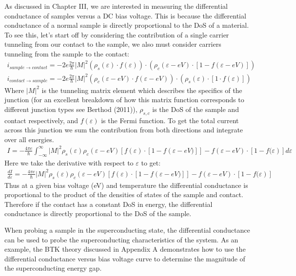 As discussed in Chapter III, we are interested in measuring the differential conductance of samples versus a DC bias voltage. This is because the differential conductance of a normal sample is directly proportional to the \ac{DoS} of a material. To see this, let's start off by considering the contribution of a single carrier tunneling from our contact to the sample, we also must consider carriers tunneling from the sample to the contact:
\begin{align}
    i_{sample \rightarrow contact} = -2e\frac{2\pi}{\hbar}|M|^{2}\left(\rho_{s}\left(\varepsilon\right)\cdot f\left(\varepsilon\right)\right)\cdot\left(\rho_{c}\left(\varepsilon-eV\right)\cdot\left[1-f\left(\varepsilon-eV\right)\right]\right)\\
    i_{contact \rightarrow sample} = -2e\frac{2\pi}{\hbar}|M|^{2}\left(\rho_{c}\left(\varepsilon-eV\right)\cdot f\left(\varepsilon-eV\right)\right)\cdot\left(\rho_{s}\left(\varepsilon\right)\cdot\left[1\cdot f\left(\varepsilon\right)\right]\right)
\end{align}
Where $|M|^2$ is the tunneling matrix element which describes the specifics of the junction (for an excellent breakdown of how this matrix function corresponds to different junction types see Berthod (2011)\cite{Berthod2011}), $\rho_{s,c}$ is the \ac{DoS} of the sample and contact respectively, and $f(\varepsilon)$ is the Fermi function. To get the total current across this junction we sum the contribution from both directions and integrate over all energies.
\begin{align}
    I = -\frac{4\pi e}{\hbar}\int_{-\infty}^{\infty}|M|^{2}\rho_{s}\left(\varepsilon\right)\rho_{c}\left(\varepsilon-eV\right)\left[f\left(\varepsilon\right)\cdot\left[1-f\left(\varepsilon-eV)\right]\right]-f(\varepsilon-eV)\cdot\left[1-f(\varepsilon\right)\right]d\varepsilon
\end{align}
Here we take the derivative with respect to $\varepsilon$ to get:
\begin{align}
    \frac{dI}{d\varepsilon} = -\frac{4\pi e}{\hbar}|M|^{2}\rho_{s}\left(\varepsilon\right)\rho_{c}\left(\varepsilon-eV\right)\left[f\left(\varepsilon\right)\cdot\left[1-f\left(\varepsilon-eV)\right]\right]-f(\varepsilon-eV)\cdot\left[1-f(\varepsilon\right)\right]
\end{align}
Thus at a given bias voltage (eV) and temperature the differential conductance is proportional to the product of the densities of states of the sample and contact. Therefore if the contact has a constant \ac{DoS} in energy, the differential conductance is directly proportional to the \ac{DoS} of the sample.\par
When probing a sample in the superconducting state, the differential conductance can be used to probe the superconducting characteristics of the system. As an example, the \ac{BTK} theory discussed in Appendix A demonstrates how to use the differential conductance versus bias voltage curve to determine the magnitude of the superconducting energy gap.


